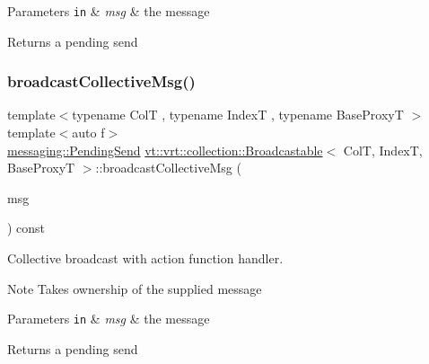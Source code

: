 \begin{DoxyParams}[1]{Parameters}
\mbox{\tt in}  & {\em msg} & the message\\
\hline
\end{DoxyParams}
\begin{DoxyReturn}{Returns}
a pending send 
\end{DoxyReturn}
\mbox{\label{structvt_1_1vrt_1_1collection_1_1_broadcastable_adf84b47c6e8b7470e62fdba1ec5aaf3e}} 
\subsubsection{\texorpdfstring{broadcast\+Collective\+Msg()}{broadcastCollectiveMsg()}\hspace{0.1cm}{\footnotesize\ttfamily [3/3]}}
{\footnotesize\ttfamily template$<$typename ColT , typename IndexT , typename Base\+ProxyT $>$ \\
template$<$auto f$>$ \\
\hyperlink{structvt_1_1messaging_1_1_pending_send}{messaging\+::\+Pending\+Send} \hyperlink{structvt_1_1vrt_1_1collection_1_1_broadcastable}{vt\+::vrt\+::collection\+::\+Broadcastable}$<$ ColT, IndexT, Base\+ProxyT $>$\+::broadcast\+Collective\+Msg (\begin{DoxyParamCaption}\item[{\hyperlink{structvt_1_1messaging_1_1_msg_ptr_thief}{messaging\+::\+Msg\+Ptr\+Thief}$<$ typename \hyperlink{structvt_1_1_obj_func_traits}{Obj\+Func\+Traits}$<$ decltype(f)$>$\+::MsgT $>$}]{msg }\end{DoxyParamCaption}) const\hspace{0.3cm}{\ttfamily [inline]}}



Collective broadcast with action function handler. 

\begin{DoxyNote}{Note}
Takes ownership of the supplied message
\end{DoxyNote}

\begin{DoxyParams}[1]{Parameters}
\mbox{\tt in}  & {\em msg} & the message\\
\hline
\end{DoxyParams}
\begin{DoxyReturn}{Returns}
a pending send 
\end{DoxyReturn}
\mbox{\label{structvt_1_1vrt_1_1collection_1_1_broadcastable_a520d37e5da6ce89657f6d33162a23003}} 
